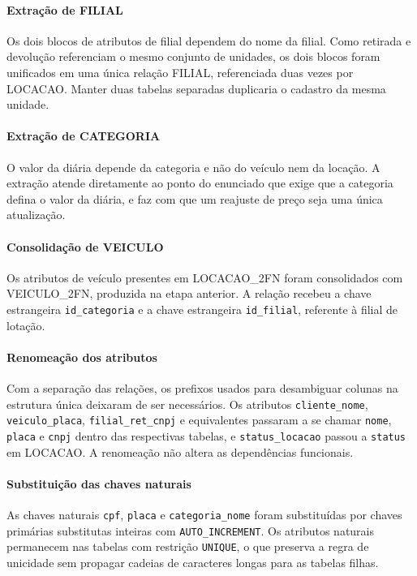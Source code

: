 \paragraph{Extra\c{c}\~ao de FILIAL} Os dois blocos de atributos de filial dependem do nome da filial. Como retirada e devolu\c{c}\~ao referenciam o mesmo conjunto de unidades, os dois blocos foram unificados em uma \'unica rela\c{c}\~ao FILIAL, referenciada duas vezes por LOCACAO. Manter duas tabelas separadas duplicaria o cadastro da mesma unidade.

\paragraph{Extra\c{c}\~ao de CATEGORIA} O valor da di\'aria depende da categoria e n\~ao do ve\'iculo nem da loca\c{c}\~ao. A extra\c{c}\~ao atende diretamente ao ponto do enunciado que exige que a categoria defina o valor da di\'aria, e faz com que um reajuste de pre\c{c}o seja uma \'unica atualiza\c{c}\~ao.

\paragraph{Consolida\c{c}\~ao de VEICULO} Os atributos de ve\'iculo presentes em LOCACAO\_2FN foram consolidados com VEICULO\_2FN, produzida na etapa anterior. A rela\c{c}\~ao recebeu a chave estrangeira \texttt{id\_categoria} e a chave estrangeira \texttt{id\_filial}, referente \`a filial de lota\c{c}\~ao.

\paragraph{Renomea\c{c}\~ao dos atributos} Com a separa\c{c}\~ao das rela\c{c}\~oes, os prefixos usados para desambiguar colunas na estrutura \'unica deixaram de ser necess\'arios. Os atributos \texttt{cliente\_nome}, \texttt{veiculo\_placa}, \texttt{filial\_ret\_cnpj} e equivalentes passaram a se chamar \texttt{nome}, \texttt{placa} e \texttt{cnpj} dentro das respectivas tabelas, e \texttt{status\_locacao} passou a \texttt{status} em LOCACAO. A renomea\c{c}\~ao n\~ao altera as depend\^encias funcionais.

\paragraph{Substitui\c{c}\~ao das chaves naturais} As chaves naturais \texttt{cpf}, \texttt{placa} e \texttt{categoria\_nome} foram substitu\'idas por chaves prim\'arias substitutas inteiras com \texttt{AUTO\_INCREMENT}. Os atributos naturais permanecem nas tabelas com restri\c{c}\~ao \texttt{UNIQUE}, o que preserva a regra de unicidade sem propagar cadeias de caracteres longas para as tabelas filhas.

